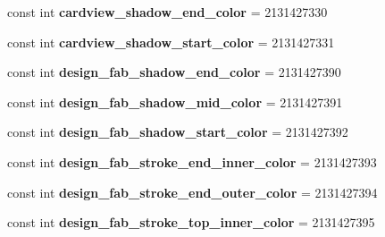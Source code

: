 \begin{DoxyCompactItemize}
\mbox{\label{class_sample_app_1_1_droid_1_1_resource_1_1_color_a3853b68ce192fa8f2ad4d5c41f64759b}} 
const int {\bfseries cardview\+\_\+shadow\+\_\+end\+\_\+color} = 2131427330
\item 
\mbox{\label{class_sample_app_1_1_droid_1_1_resource_1_1_color_a749ea2de41975f25dd080981e347afc1}} 
const int {\bfseries cardview\+\_\+shadow\+\_\+start\+\_\+color} = 2131427331
\item 
\mbox{\label{class_sample_app_1_1_droid_1_1_resource_1_1_color_ad04c2aadf7473f90a7237df10ae6d84a}} 
const int {\bfseries design\+\_\+fab\+\_\+shadow\+\_\+end\+\_\+color} = 2131427390
\item 
\mbox{\label{class_sample_app_1_1_droid_1_1_resource_1_1_color_a3db6bf5403aa3e722b9b85ebd7a1164d}} 
const int {\bfseries design\+\_\+fab\+\_\+shadow\+\_\+mid\+\_\+color} = 2131427391
\item 
\mbox{\label{class_sample_app_1_1_droid_1_1_resource_1_1_color_a49ea9bfc508b4377d3e0a7b27736e7ad}} 
const int {\bfseries design\+\_\+fab\+\_\+shadow\+\_\+start\+\_\+color} = 2131427392
\item 
\mbox{\label{class_sample_app_1_1_droid_1_1_resource_1_1_color_a720c74fffdf83b27c3e20ea51e60e46c}} 
const int {\bfseries design\+\_\+fab\+\_\+stroke\+\_\+end\+\_\+inner\+\_\+color} = 2131427393
\item 
\mbox{\label{class_sample_app_1_1_droid_1_1_resource_1_1_color_a54f49da9a601cbdff1014e3d54b60dd5}} 
const int {\bfseries design\+\_\+fab\+\_\+stroke\+\_\+end\+\_\+outer\+\_\+color} = 2131427394
\item 
\mbox{\label{class_sample_app_1_1_droid_1_1_resource_1_1_color_a9c7783c556f2b9fc293f734ac518624e}} 
const int {\bfseries design\+\_\+fab\+\_\+stroke\+\_\+top\+\_\+inner\+\_\+color} = 2131427395
\item 

\end{DoxyCompactItemize}
